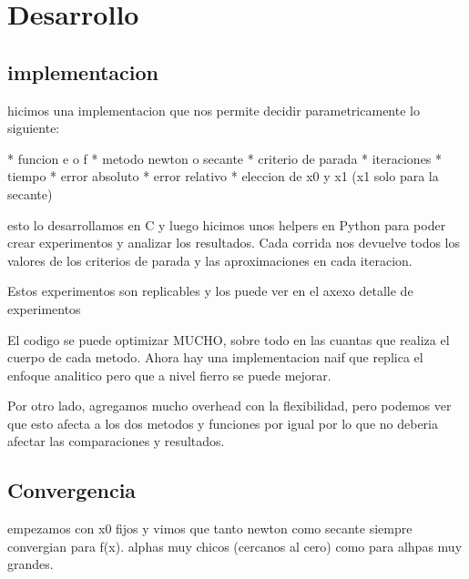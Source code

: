 \newpage \section{Desarrollo}

\subsection{implementacion}

hicimos una implementacion que nos permite decidir parametricamente lo siguiente:

* funcion e o f
* metodo newton o secante
* criterio de parada
  * iteraciones
  * tiempo
  * error absoluto
  * error relativo
* eleccion de x0 y x1 (x1 solo para la secante)

esto lo desarrollamos en C y luego hicimos unos helpers en Python para poder
crear experimentos y analizar los resultados. Cada corrida nos devuelve todos
los valores de los criterios de parada y las aproximaciones en cada iteracion.

Estos experimentos son replicables y los puede ver en el axexo {detalle de experimentos}

El codigo se puede optimizar MUCHO, sobre todo en las cuantas que realiza el
cuerpo de cada metodo. Ahora hay una implementacion naif que replica el enfoque
analitico pero que a nivel fierro se puede mejorar.

Por otro lado, agregamos mucho overhead con la flexibilidad, pero podemos ver
que esto afecta a los dos metodos y funciones por igual por lo que no deberia
afectar las comparaciones y resultados.

\subsection{Convergencia}

empezamos con x0 fijos y vimos que tanto newton como secante siempre convergian
para f(x). %
alphas muy chicos (cercanos al cero) como para alhpas muy grandes.

